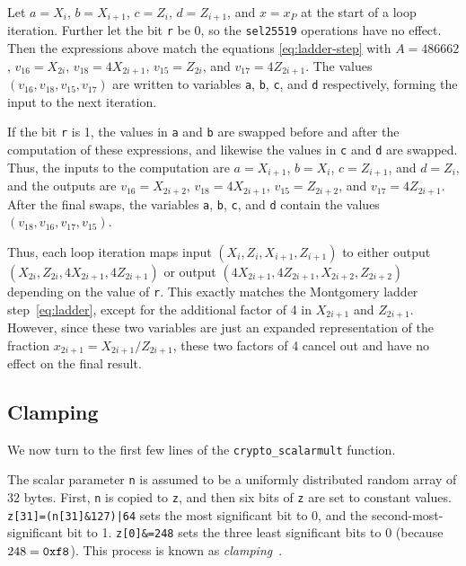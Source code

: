 \documentclass{article}
\begin{document}
Let $a = X_i$, $b = X_{i+1}$, $c = Z_i$, $d = Z_{i+1}$, and $x = x_P$ at the start of a loop iteration.
Further let the bit \verb|r| be 0, so the \verb|sel25519| operations have no effect.
Then the expressions above match the equations \eqref{eq:ladder-step} with $A = 486662$, $v_{16} = X_{2i}$, $v_{18} = 4X_{2i+1}$, $v_{15} = Z_{2i}$, and $v_{17} = 4Z_{2i+1}$.
The values $(v_{16}, v_{18}, v_{15}, v_{17})$ are written to variables \verb|a|, \verb|b|, \verb|c|, and \verb|d| respectively, forming the input to the next iteration.

If the bit \verb|r| is 1, the values in \verb|a| and \verb|b| are swapped before and after the computation of these expressions, and likewise the values in \verb|c| and \verb|d| are swapped.
Thus, the inputs to the computation are $a = X_{i+1}$, $b = X_i$, $c = Z_{i+1}$, and $d = Z_i$, and the outputs are $v_{16} = X_{2i+2}$, $v_{18} = 4X_{2i+1}$, $v_{15} = Z_{2i+2}$, and $v_{17} = 4Z_{2i+1}$.
After the final swaps, the variables \verb|a|, \verb|b|, \verb|c|, and \verb|d| contain the values $(v_{18}, v_{16}, v_{17}, v_{15})$.

Thus, each loop iteration maps input $(X_i, Z_i, X_{i+1}, Z_{i+1})$ to either output $(X_{2i}, Z_{2i}, 4X_{2i+1}, 4Z_{2i+1})$ or output $(4X_{2i+1}, 4Z_{2i+1}, X_{2i+2}, Z_{2i+2})$ depending on the value of \verb|r|.
This exactly matches the Montgomery ladder step~\eqref{eq:ladder}, except for the additional factor of 4 in $X_{2i+1}$ and $Z_{2i+1}$.
However, since these two variables are just an expanded representation of the fraction $x_{2i+1} = X_{2i+1}/Z_{2i+1}$, these two factors of 4 cancel out and have no effect on the final result.

\subsection{Clamping}\label{sec:clamping}

We now turn to the first few lines of the \verb|crypto_scalarmult| function.

The scalar parameter \verb|n| is assumed to be a uniformly distributed random array of 32 bytes.
First, \verb|n| is copied to \verb|z|, and then six bits of \verb|z| are set to constant values.
\verb+z[31]=(n[31]&127)|64+ sets the most significant bit to 0, and the second-most-significant bit to 1.
\verb+z[0]&=248+ sets the three least significant bits to 0 (because $248 = \verb|0xf8|$).
This process is known as \emph{clamping}~\cite{Madden:2020}.
\end{document}
